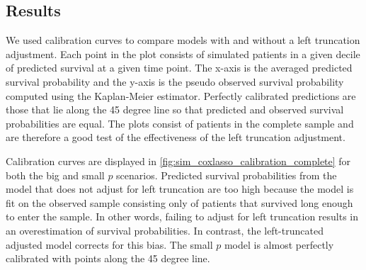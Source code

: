 \documentclass[11pt,final,fleqn]{article}\usepackage[]{graphicx}\usepackage[]{color}
\theoremstyle{plain}
\begin{document}
\subsection{Results}
We used calibration curves \citep{harrell2015regression} to compare models with and without a left truncation adjustment. Each point in the plot consists of simulated patients in a given decile of predicted survival at a given time point. The x-axis is the averaged predicted survival probability and the y-axis is the pseudo observed survival probability computed using the Kaplan-Meier estimator. Perfectly calibrated predictions are those that lie along the 45 degree line so that predicted and observed survival probabilities are equal. The plots consist of patients in the complete sample and are therefore a good test of the effectiveness of the left truncation adjustment.

Calibration curves are displayed in \autoref{fig:sim_coxlasso_calibration_complete} for both the big and small $p$ scenarios. Predicted survival probabilities from the model that does not adjust for left truncation are too high because the model is fit on the observed sample consisting only of patients that survived long enough to enter the sample. In other words, failing to adjust for left truncation results in an overestimation of survival probabilities. In contrast, the left-truncated adjusted model corrects for this bias. The small $p$ model is almost perfectly calibrated with points along the 45 degree line.
\end{document}
